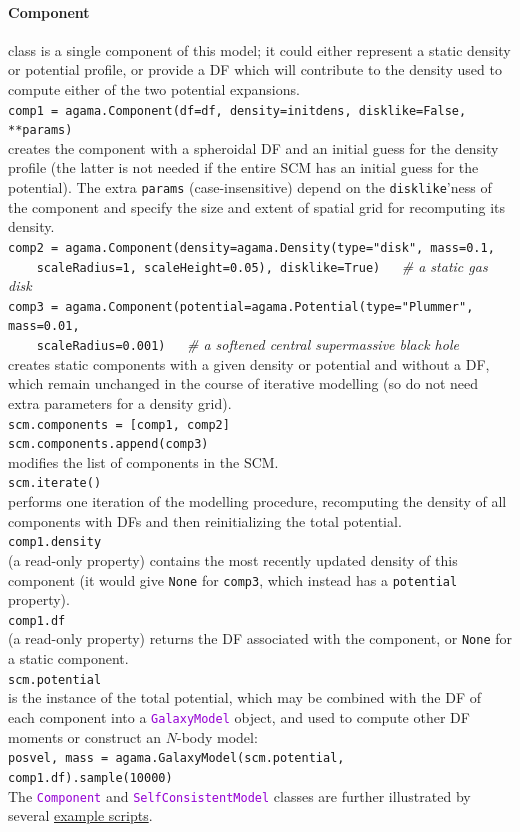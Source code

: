 \documentclass[12pt]{article}
\newcommand{\ttt}[1]{\textcolor{darkviolet}{\texttt{#1}}}
\let\oldparagraph\paragraph
\renewcommand{\paragraph}[1]{\vspace{-2mm}\oldparagraph{#1}}
\begin{document}
\paragraph{Component} class is a single component of this model; it could either represent a static density or potential profile, or provide a DF which will contribute to the density used to compute either of the two potential expansions.\\[2mm]
\texttt{comp1 = agama.Component(df=df, density=initdens, disklike=False, **params)}\\
creates the component with a spheroidal DF and an initial guess for the density profile (the latter is not needed if the entire SCM has an initial guess for the potential). The extra \texttt{params} (case-insensitive) depend on the \texttt{disklike}'ness of the component and specify the size and extent of spatial grid for recomputing its density.\\[1mm]
\texttt{comp2 = agama.Component(density=agama.Density(type="disk", mass=0.1,\\
\mbox{}~~~~scaleRadius=1, scaleHeight=0.05), disklike=True)\ \ \ }\textit{\color{Sepia}\# a static gas disk}\\
\texttt{comp3 = agama.Component(potential=agama.Potential(type="Plummer", mass=0.01,\\
\mbox{}~~~~scaleRadius=0.001)\ \ \ }\textit{\color{Sepia}\# a softened central supermassive black hole}\\
creates static components with a given density or potential and without a DF, which remain unchanged in the course of iterative modelling (so do not need extra parameters for a density grid).\\[2mm]
\texttt{scm.components = [comp1, comp2]}\\
\texttt{scm.components.append(comp3)}\\
modifies the list of components in the SCM.\\[2mm]
\texttt{scm.iterate()}\\
performs one iteration of the modelling procedure, recomputing the density of all components with DFs and then reinitializing the total potential.\\[2mm]
\texttt{comp1.density}\\
(a read-only property) contains the most recently updated density of this component (it would give \texttt{None} for \texttt{comp3}, which instead has a \texttt{potential} property). \\[2mm]
\texttt{comp1.df}\\
(a read-only property) returns the DF associated with the component, or \texttt{None} for a static component.\\[2mm]
\texttt{scm.potential}\\ is the instance of the total potential, which may be combined with the DF of each component into a \ttt{GalaxyModel} object, and used to compute other DF moments or construct an $N$-body model:\\
\texttt{posvel, mass = agama.GalaxyModel(scm.potential, comp1.df).sample(10000)}\\[2mm]
The \ttt{Component} and \ttt{SelfConsistentModel} classes are further illustrated by several \hyperref[sec:ExampleSCM]{example scripts}.
\end{document}
